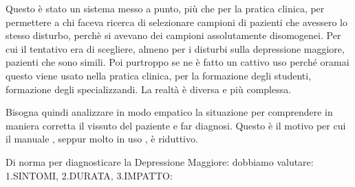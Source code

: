 Questo è stato un sistema messo a punto, più che per la pratica clinica,
per permettere a chi faceva ricerca di selezionare campioni di pazienti
che avessero lo stesso disturbo, perchè si avevano dei campioni
assolutamente disomogenei. Per cui il tentativo era di scegliere, almeno
per i disturbi sulla depressione maggiore, pazienti che sono simili. Poi
purtroppo se ne è fatto un cattivo uso perché oramai questo viene usato
nella pratica clinica, per la formazione degli studenti, formazione
degli specializzandi. La realtà è diversa e più complessa.

Bisogna quindi analizzare in modo empatico la situazione per comprendere
in maniera corretta il vissuto del paziente e far diagnosi. Questo è il
motivo per cui il manuale , seppur molto in uso , è riduttivo.

Di norma per diagnosticare la Depressione Maggiore: dobbiamo valutare:
1.SINTOMI, 2.DURATA, 3.IMPATTO:

